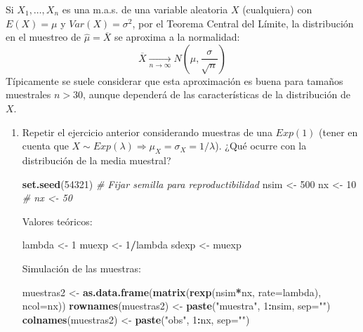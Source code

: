 \documentclass[
]{book}
\newenvironment{Shaded}{\begin{snugshade}}{\end{snugshade}}
\newcommand{\CommentTok}[1]{\textcolor[rgb]{0.56,0.35,0.01}{\textit{#1}}}
\newcommand{\DataTypeTok}[1]{\textcolor[rgb]{0.13,0.29,0.53}{#1}}
\newcommand{\DecValTok}[1]{\textcolor[rgb]{0.00,0.00,0.81}{#1}}
\newcommand{\KeywordTok}[1]{\textcolor[rgb]{0.13,0.29,0.53}{\textbf{#1}}}
\newcommand{\NormalTok}[1]{#1}
\newcommand{\OperatorTok}[1]{\textcolor[rgb]{0.81,0.36,0.00}{\textbf{#1}}}
\newcommand{\StringTok}[1]{\textcolor[rgb]{0.31,0.60,0.02}{#1}}
\theoremstyle{break}
\theoremstyle{definition}
\theoremstyle{definition}
\theoremstyle{definition}
\theoremstyle{remark}
\begin{document}
Si \(X_{1},\ldots,X_{n}\) es una m.a.s. de una variable aleatoria
\(X\) (cualquiera) con \(E\left( X \right) = \mu\) y
\(Var\left( X \right) = \sigma^{2}\), por el Teorema Central del Límite,
la distribución en el muestreo de \(\hat{\mu}=\overline{X}\) se aproxima a la
normalidad:
\[\overline{X}\underset{n\rightarrow\infty}{\longrightarrow}
N\left( \mu, \dfrac{\sigma}{\sqrt{n}}\right)\]
Típicamente se suele considerar que esta aproximación es buena
para tamaños muestrales \(n>30\),
aunque dependerá de las características de la distribución de \(X\).

\begin{enumerate}
\def\labelenumi{\alph{enumi})}
\item
  Repetir el ejercicio anterior considerando muestras de una
  \(Exp(1)\) (tener en cuenta que
  \(X\sim Exp(\lambda)\Rightarrow\mu_{X}=\sigma_{X}=1/\lambda\)).
  ¿Qué ocurre con la distribución de la media muestral?

\begin{Shaded}
\begin{Highlighting}[]
\KeywordTok{set.seed}\NormalTok{(}\DecValTok{54321}\NormalTok{) }\CommentTok{# Fijar semilla para reproductibilidad}
\NormalTok{nsim <-}\StringTok{ }\DecValTok{500}
\NormalTok{nx <-}\StringTok{ }\DecValTok{10}    
\CommentTok{# nx <- 50}
\end{Highlighting}
\end{Shaded}

  Valores teóricos:

\begin{Shaded}
\begin{Highlighting}[]
\NormalTok{lambda <-}\StringTok{ }\DecValTok{1}
\NormalTok{muexp <-}\StringTok{ }\DecValTok{1}\OperatorTok{/}\NormalTok{lambda}
\NormalTok{sdexp <-}\StringTok{ }\NormalTok{muexp}
\end{Highlighting}
\end{Shaded}

  Simulación de las muestras:

\begin{Shaded}
\begin{Highlighting}[]
\NormalTok{muestras2 <-}\StringTok{ }\KeywordTok{as.data.frame}\NormalTok{(}\KeywordTok{matrix}\NormalTok{(}\KeywordTok{rexp}\NormalTok{(nsim}\OperatorTok{*}\NormalTok{nx, }\DataTypeTok{rate=}\NormalTok{lambda), }\DataTypeTok{ncol=}\NormalTok{nx))}
\KeywordTok{rownames}\NormalTok{(muestras2) <-}\StringTok{ }\KeywordTok{paste}\NormalTok{(}\StringTok{"muestra"}\NormalTok{, }\DecValTok{1}\OperatorTok{:}\NormalTok{nsim, }\DataTypeTok{sep=}\StringTok{""}\NormalTok{)}
\KeywordTok{colnames}\NormalTok{(muestras2) <-}\StringTok{ }\KeywordTok{paste}\NormalTok{(}\StringTok{"obs"}\NormalTok{, }\DecValTok{1}\OperatorTok{:}\NormalTok{nx, }\DataTypeTok{sep=}\StringTok{""}\NormalTok{)}
\end{Highlighting}
\end{Shaded}


\end{enumerate}
\end{document}
